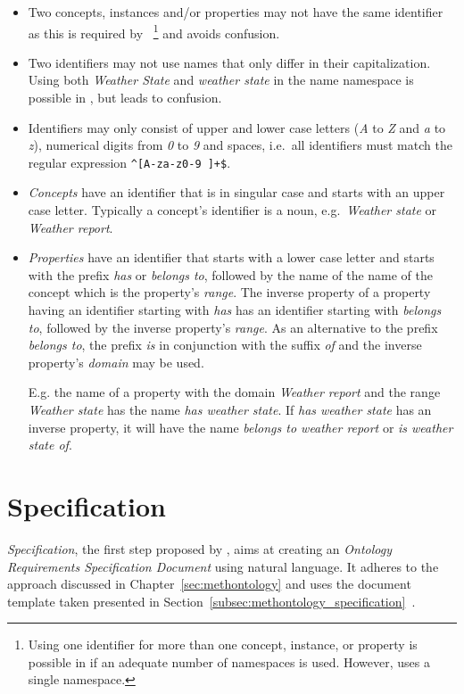 \begin{itemize}
  \item Two concepts, instances and/or properties may not have the same identifier as this is required by ~\cite{OWL}\footnote{Using one identifier for more than one concept, instance, or property is possible in  if an adequate number of namespaces is used. However, \smarthomeweather uses a single namespace.} and avoids confusion.
  \item Two identifiers may not use names that only differ in their capitalization. Using both \emph{Weather State} and \emph{weather state} in the name namespace is possible in , but leads to confusion.
  \item Identifiers may only consist of upper and lower case  letters (\emph{A} to \emph{Z} and \emph{a} to \emph{z}), numerical digits from \emph{0} to \emph{9} and spaces, i.e.\ all identifiers must match the regular expression \texttt{\textasciicircum[A-za-z0-9~]+\$}.
  \item \emph{Concepts} have an identifier that is in singular case and starts with an upper case letter. Typically a concept's identifier is a noun, e.g.\ \emph{Weather state} or \emph{Weather report}.
  \item \emph{Properties} have an identifier that starts with a lower case letter and starts with the prefix \emph{has} or \emph{belongs to}, followed by the name of the name of the concept which is the property's \emph{range}. The inverse property of a property having an identifier starting with \emph{has} has an identifier starting with \emph{belongs to}, followed by the inverse property's \emph{range}. As an alternative to the prefix \emph{belongs to}, the prefix \emph{is} in conjunction with the suffix \emph{of} and the inverse property's \emph{domain} may be used.
  
  E.g. the name of a property with the domain \emph{Weather report} and the range \emph{Weather state} has the name \emph{has weather state}. If \emph{has weather state} has an inverse property, it will have the name \emph{belongs to weather report} or \emph{is weather state of}.
\end{itemize}


\section{Specification}
\label{sec:ontology_specification}

\emph{Specification}, the first step proposed by \methontology, aims at creating an \emph{Ontology Requirements Specification Document} using natural language. It adheres to the approach discussed in Chapter~\ref{sec:methontology} and uses the document template taken presented in Section~\ref{subsec:methontology_specification}~\cite{ORSD}.

